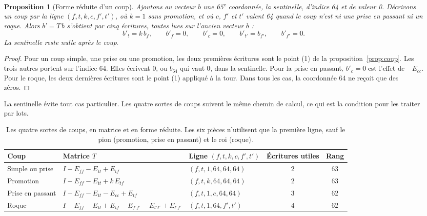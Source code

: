 \documentclass[11pt,a4paper]{article}
\newcounter{calcul}
\theoremstyle{plain}
\newtheorem{proposition}{Proposition}
\begin{document}
\begin{proposition}[Forme réduite d'un coup]\label{prop:reduit}
Ajoutons au vecteur $b$ une 65\textsuperscript{e} coordonnée, la \emph{sentinelle}, d'indice 64
et de valeur 0. Décrivons un coup par la ligne $(f, t, k, c, f', t')$, où $k = 1$ sans promotion,
et où $c$, $f'$ et $t'$ valent 64 quand le coup n'est ni une prise en passant ni un roque. Alors
$b' = T\,b$ s'obtient par cinq écritures, toutes lues sur l'ancien vecteur $b$ :
\[ b'_t = k\,b_f,\qquad b'_f = 0,\qquad b'_c = 0,\qquad b'_{t'} = b_{f'},\qquad b'_{f'} = 0. \]
La sentinelle reste nulle après le coup.
\end{proposition}
\begin{proof}
Pour un coup simple, une prise ou une promotion, les deux premières écritures sont le point (1)
de la proposition~\ref{prop:coup}. Les trois autres portent sur l'indice 64. Elles écrivent 0,
ou $b_{64}$ qui vaut 0, dans la sentinelle. Pour la prise en passant, $b'_c = 0$ est l'effet de
$-E_{cc}$. Pour le roque, les deux dernières écritures sont le point (1) appliqué à la tour. Dans
tous les cas, la coordonnée 64 ne reçoit que des zéros.
\end{proof}

La sentinelle évite tout cas particulier. Les quatre sortes de coups suivent le même chemin de
calcul, ce qui est la condition pour les traiter par lots.

\begin{table}[H]
\centering\small
\begin{tabular}{>{\raggedright\arraybackslash}p{2.5cm}>{\raggedright\arraybackslash}p{5.6cm}lcc}
\toprule
Coup & Matrice $T$ & Ligne $(f, t, k, c, f', t')$ & Écritures utiles & Rang\\
\midrule
Simple ou prise & $I - E_{ff} - E_{tt} + E_{tf}$ & $(f, t, 1, 64, 64, 64)$ & 2 & 63\\
Promotion & $I - E_{ff} - E_{tt} + k\,E_{tf}$ & $(f, t, k, 64, 64, 64)$ & 2 & 63\\
Prise en passant & $I - E_{ff} - E_{tt} - E_{cc} + E_{tf}$ & $(f, t, 1, c, 64, 64)$ & 3 & 62\\
Roque & $I - E_{ff} - E_{tt} + E_{tf} - E_{f'f'} - E_{t't'} + E_{t'f'}$ & $(f, t, 1, 64, f', t')$ &
4 & 62\\
\bottomrule
\end{tabular}
\caption{Les quatre sortes de coups, en matrice et en forme réduite. Les six pièces n'utilisent
que la première ligne, sauf le pion (promotion, prise en passant) et le roi (roque).}
\end{table}
\end{document}
